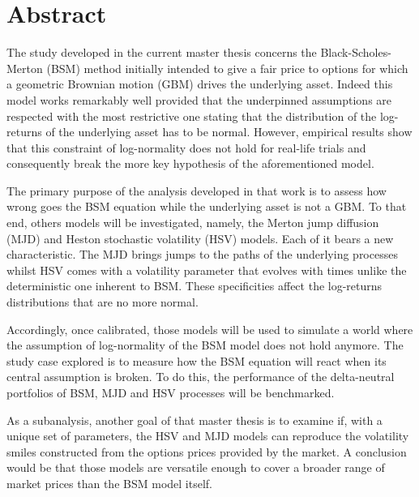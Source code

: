 \documentclass[12pt,a4paper]{report}
\begin{document}


\begin{titlepage}

\end{titlepage}

\newpage\null\thispagestyle{empty}\newpage





\chapter*{Abstract}
 
The study developed in the current master thesis concerns the Black-Scholes-Merton (BSM) method initially intended to give a fair price to options for which a geometric Brownian motion (GBM) drives the underlying asset.
Indeed this model works remarkably well provided that the underpinned assumptions are respected with the most restrictive one stating that the distribution of the log-returns of the underlying asset has to be normal.
However, empirical results show that this constraint of log-normality does not hold for real-life trials and consequently break the more key hypothesis of the aforementioned model.

The primary purpose of the analysis developed in that work is to assess how wrong goes the BSM equation while the underlying asset is not a GBM.
To that end, others models will be investigated, namely, the Merton jump diffusion (MJD) and Heston stochastic volatility (HSV) models.
Each of it bears a new characteristic. The MJD brings jumps to the paths of the underlying processes whilst HSV comes with a volatility parameter that evolves with times unlike the deterministic one inherent to BSM. These specificities affect the log-returns distributions that are no more normal.

Accordingly, once calibrated, those models will be used to simulate a world where the assumption of log-normality of the BSM model does not hold anymore. The study case explored is to measure how the BSM equation will react when its central assumption is broken.
To do this, the performance of the delta-neutral portfolios of BSM, MJD and HSV processes will be benchmarked.

As a subanalysis, another goal of that master thesis is to examine if, with a unique set of parameters, the HSV and MJD models can reproduce the volatility smiles constructed from the options prices provided by the market.
A conclusion would be that those models are versatile enough to cover a broader range of market prices than the BSM model itself.
\end{document}
